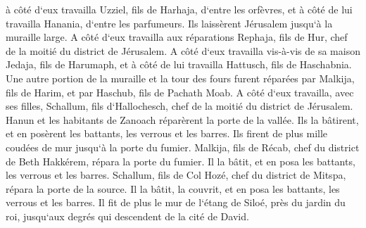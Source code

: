 \verse à côté d`eux travailla Uzziel, fils de Harhaja, d`entre les orfèvres, et à côté de lui travailla Hanania, d`entre les parfumeurs. Ils laissèrent Jérusalem jusqu`à la muraille large. 
\verse A côté d`eux travailla aux réparations Rephaja, fils de Hur, chef de la moitié du district de Jérusalem. 
\verse A côté d`eux travailla vis-à-vis de sa maison Jedaja, fils de Harumaph, et à côté de lui travailla Hattusch, fils de Haschabnia. 
\verse Une autre portion de la muraille et la tour des fours furent réparées par Malkija, fils de Harim, et par Haschub, fils de Pachath Moab. 
\verse A côté d`eux travailla, avec ses filles, Schallum, fils d`Hallochesch, chef de la moitié du district de Jérusalem. 
\verse Hanun et les habitants de Zanoach réparèrent la porte de la vallée. Ils la bâtirent, et en posèrent les battants, les verrous et les barres. Ils firent de plus mille coudées de mur jusqu`à la porte du fumier. 
\verse Malkija, fils de Récab, chef du district de Beth Hakkérem, répara la porte du fumier. Il la bâtit, et en posa les battants, les verrous et les barres. 
\verse Schallum, fils de Col Hozé, chef du district de Mitspa, répara la porte de la source. Il la bâtit, la couvrit, et en posa les battants, les verrous et les barres. Il fit de plus le mur de l`étang de Siloé, près du jardin du roi, jusqu`aux degrés qui descendent de la cité de David. 
